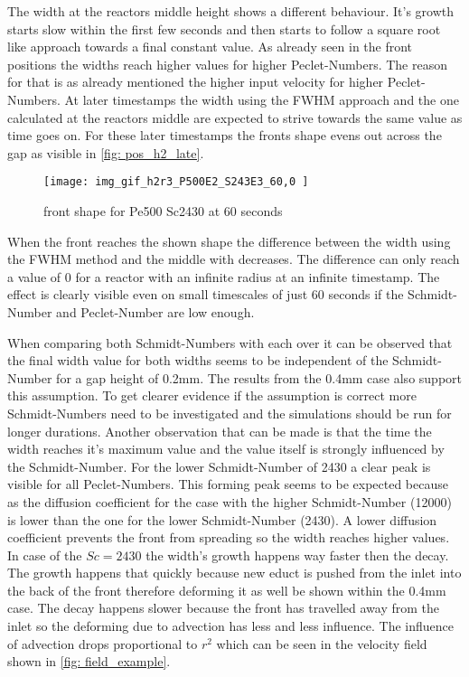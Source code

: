 \documentclass[../thesis.tex]{subfiles}
\begin{document}
The width at the reactors middle height shows a different behaviour. It's growth starts slow within the first few seconds and then starts to follow a square root like approach towards a final constant value. As already seen in the front positions the widths reach higher values for higher Peclet-Numbers. The reason for that is as already mentioned the higher input velocity for higher Peclet-Numbers. At later timestamps the width using the FWHM approach and the one calculated at the reactors middle are expected to strive towards the same value as time goes on. For these later timestamps the fronts shape evens out across the gap as visible in \autoref{fig: pos_h2_late}.
\begin{figure}[htb]
	\centering
	\texttt{[image: img\_gif\_h2r3\_P500E2\_S243E3\_60,0 ]}
	\caption{front shape for Pe500 Sc2430 at 60 seconds}
	\label{fig: pos_h2_late}
\end{figure}
When the front reaches the shown shape the difference between the width using the FWHM method and the middle with decreases. The difference can only reach a value of 0 for a reactor with an infinite radius at an infinite timestamp. The effect is clearly visible even on small timescales of just 60 seconds if the Schmidt-Number and Peclet-Number are low enough.

When comparing both Schmidt-Numbers with each over it can be observed that the final width value for both widths seems to be independent of the Schmidt-Number for a gap height of 0.2mm. The results from the 0.4mm case also support this assumption. To get clearer evidence if the assumption is correct more Schmidt-Numbers need to be investigated and the simulations should be run for longer durations. 
Another observation that can be made is that the time the width reaches it's maximum value and the value itself is strongly influenced by the Schmidt-Number. For the lower Schmidt-Number of 2430 a clear peak is visible for all Peclet-Numbers. This forming peak seems to be expected because as the diffusion coefficient for the case with the higher Schmidt-Number (12000) is lower than the one for the lower Schmidt-Number (2430). A lower diffusion coefficient prevents the front from spreading so the width reaches higher values. In case of the $Sc = 2430$ the width's growth happens way faster then the decay. The growth happens that quickly because new educt is pushed from the inlet into the back of the front therefore deforming it as well be shown within the 0.4mm case. The decay happens slower because the front has travelled away from the inlet so the deforming due to advection has less and less influence. The influence of advection drops proportional to $r^2$ which can be seen in the velocity field shown in \autoref{fig: field_example}. 
\end{document}
